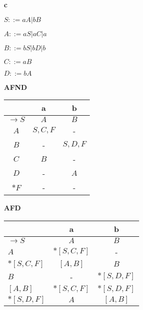 \documentclass[ ]{article}
\begin{document}
		\newpage
		\textbf{c}
		
		$S ::= aA | bB$
		
		$A ::= aS | aC | a$
		
		$B ::= bS | bD | b$
		
		$C ::= aB$
		
		$D ::= bA$
		
\begin{center}
    \begin{minipage}[t]{0.48\textwidth} %
        \centering %
        \textbf{AFND}\\ %
        \vspace{0.2cm} %
        \begin{tabular}{|c|c|c|} %
            \toprule %
            & a & b \\
            \midrule %
		$\to S$ & $A$ & $B$\\
		$A$ & $S,C,F$ & -\\
		$B$ & - & $S,D,F$\\
		$C$ & $B$ & -\\
		$D$ & - & $A$\\
		$*F$ & - & -\\
            \bottomrule %
        \end{tabular}
    \end{minipage}%
    \hfill %
    \begin{minipage}[t]{0.48\textwidth} %
        \centering %
        \textbf{AFD}\\ %
        \vspace{0.2cm} %
        \begin{tabular}{|l|c|c|} %
            \toprule %
            & a & b \\
            \midrule %
		$\to S$ & $A$ & $B$\\
		$A$ & $*[S,C,F]$ & -\\
		$*[S,C,F]$ & $[A,B]$ & $B$\\
		$B$ & - & $*[S,D,F]$\\
		$[A,B]$ & $*[S,C,F]$ & $*[S,D,F]$\\
		$*[S,D,F]$ & $A$ & $[A,B]$\\
            \bottomrule %
        \end{tabular}
    \end{minipage}
\end{center}
\end{document}
